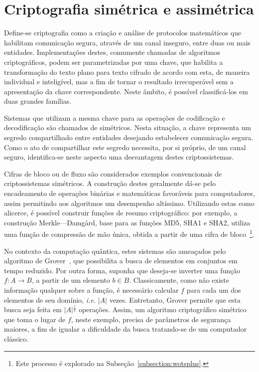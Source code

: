 \documentclass{ufsctex/ufsctex}
\newcommand{\length}[1]{\vert{} #1 \vert{}}
\begin{document}
\section{Criptografia simétrica e assimétrica}\label{section:crypto}

Define-se criptografia como a criação e análise de protocolos matemáticos que
habilitam comunicação segura, através de um canal inseguro, entre duas ou mais
entidades. Implementações destes, comumente chamadas de algoritmos
criptográficos, podem ser parametrizadas por uma chave, que habilita a
transformação do texto plano para texto cifrado de acordo com esta, de maneira
individual e inteligível, mas a fim de tornar o resultado irrecuperável sem a
apresentação da chave correspondente.  Neste âmbito, é possível classificá-los
em duas grandes famílias.

Sistemas que utilizam a mesma chave para as operações de codificação e
decodificação são chamados de simétricos. Nesta situação, a chave representa um
segredo compartilhado entre entidades desejando estabelecer comunicação segura.
Como o ato de compartilhar este segredo necessita, por si próprio, de um canal
seguro, identifica-se neste aspecto uma desvantagem destes criptossistemas.

Cifras de bloco ou de fluxo são considerados exemplos convencionais de
criptossistemas simétricos.  A construção destes geralmente dá-se pelo
encadeamento de operações binárias e matemáticas favoráveis para computadores,
assim permitindo aos algoritmos um desempenho altíssimo. Utilizando estas como
alicerce, é possível construir funções de resumo criptográfico: por exemplo, a
construção Merkle---Damgård, base para as funções MD5,
SHA1 e SHA2, utiliza uma função de
compressão de mão única, obtida a partir de uma cifra de
bloco~\cite[Algoritmo 9.41]{Menezes:book:1996}\footnote{Este processo é
explorado na Subseção~\ref{subsection:wotsplus}.}.

No contexto da computação quântica, estes sistemas são ameaçados pelo algoritmo
de Grover~\cite{Grover:inproc:1996:may}, que possibilita a busca de
elementos em conjuntos em tempo reduzido.  Por outra forma, suponha que
deseja-se inverter uma função $f : A \longrightarrow B$, a partir de um
elemento $b \in B$. Classicamente, como não existe informação qualquer sobre a
função, é necessário calcular $f$ para cada um dos elementos de seu domínio,
\emph{i.e.} $\length{A}$\simbolo{$\length{\omega}$}{Tamanho da palavra
$\omega$} vezes. Entretanto, Grover permite que esta busca seja feita em
$\length{A}^{\frac{1}{2}}$ operações. Assim, um algoritmo criptográfico
simétrico que toma o lugar de $f$, neste exemplo, precisa de parâmetros de
segurança maiores, a fim de igualar a dificuldade da busca tratando-se de um
computador clássico.
\end{document}
